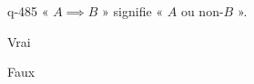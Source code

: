 \begin{truefalse}{q-485}
« $A \implies B$ » signifie « $A$ ou non-$B$ ».
\item Vrai
\item* Faux
\end{truefalse}


